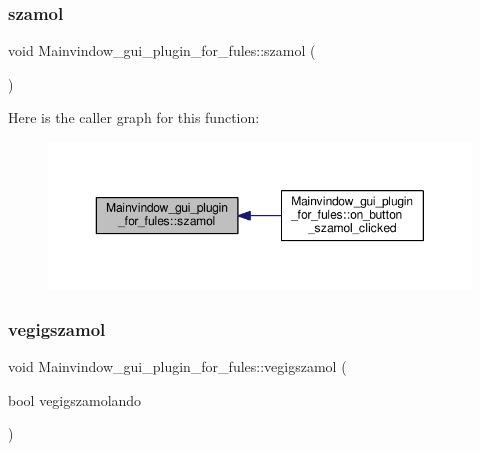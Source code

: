 \subsubsection{\texorpdfstring{szamol}{szamol}}
{\footnotesize\ttfamily void Mainvindow\+\_\+gui\+\_\+plugin\+\_\+for\+\_\+fules\+::szamol (\begin{DoxyParamCaption}{ }\end{DoxyParamCaption})\hspace{0.3cm}{\ttfamily [signal]}}

Here is the caller graph for this function\+:\nopagebreak
\begin{figure}[H]
\begin{center}
\leavevmode
\includegraphics[width=350pt]{classMainvindow__gui__plugin__for__fules_ab44bcc45064b346477fef5df26a119cc_icgraph}
\end{center}
\end{figure}
\mbox{\label{classMainvindow__gui__plugin__for__fules_a080c54bd4e8e65ffcaacad58e900248a}} 
\subsubsection{\texorpdfstring{vegigszamol}{vegigszamol}}
{\footnotesize\ttfamily void Mainvindow\+\_\+gui\+\_\+plugin\+\_\+for\+\_\+fules\+::vegigszamol (\begin{DoxyParamCaption}\item[{bool}]{vegigszamolando }\end{DoxyParamCaption})\hspace{0.3cm}{\ttfamily [signal]}}

